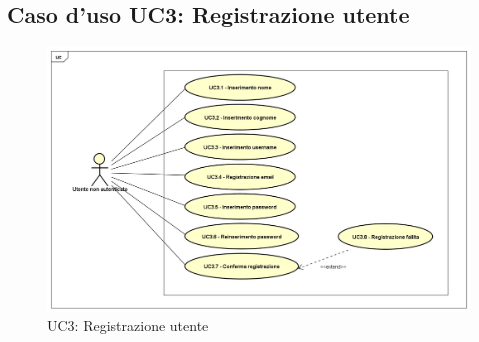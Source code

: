 \newpage
\subsection{Caso d'uso UC3: Registrazione utente }
\label{UC3}
\begin{figure}[ht]
	\centering
	\includegraphics[scale=0.45]{UML/UC3.png}
	\caption{UC3: Registrazione utente}
\end{figure}

